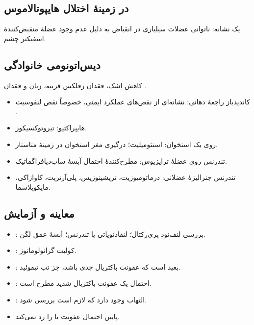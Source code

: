 \documentclass[12pt,a4paper]{article}
\begin{document}
\subsection*{ در زمینهٔ اختلال هایپوتالاموس}
یک نشانه: ناتوانی عضلات سیلیاری در انقباض به دلیل عدم وجود عضلهٔ منقبض‌کنندهٔ اسفنکتر چشم.

\subsection*{دیس‌اتونومی خانوادگی}
کاهش اشک، فقدان رفلکس قرنیه، زبان  و فقدان .

\begin{itemize}
\item کاندیدیاز راجعهٔ دهانی: نشانه‌ای از نقص‌های عملکرد ایمنی، خصوصاً نقص لنفوسیت .
\item {} هایپراکتیو: تیروتوکسیکوز.
\item {} روی یک استخوان: استئومیلیت؛ درگیری مغز استخوان در زمینهٔ متاستاز.
\item تندرنس روی عضلهٔ تراپزیوس: مطرح‌کنندهٔ احتمال آبسهٔ ساب‌دیافراگماتیک.
\item تندرنس جنرالیزهٔ عضلانی: درماتومیوزیت، تریشینوزیس، پلی‌آرتریت، کاوازاکی، مایکوپلاسما.
\end{itemize}

\subsection*{معاینه و آزمایش}
\begin{itemize}
\item {}: بررسی لنف‌نود پری‌رکتال؛ لنفادنوپاتی یا تندرنس؛ آبسهٔ عمق لگن.
\item {}: کولیت گرانولوماتوز.
\item {}: بعید است که عفونت باکتریال جدی باشد، جز تب تیفوئید.
\item {}: احتمال یک عفونت باکتریال شدید مطرح است.
\item {}: التهاب وجود دارد که لازم است بررسی شود.
\item {} پایین احتمال عفونت یا  را رد نمی‌کند.
\end{itemize}
\end{document}
